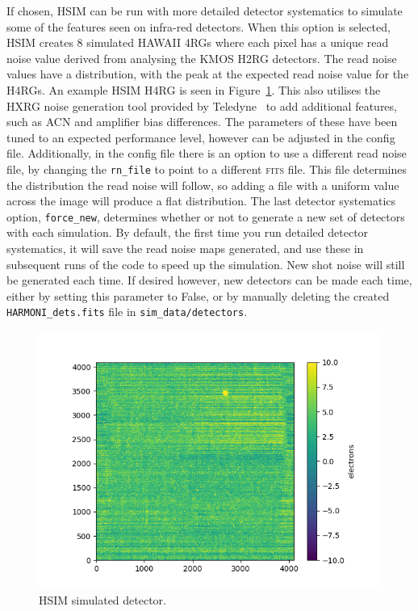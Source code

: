 \documentclass[12pt]{report}
\begin{document}
If chosen, HSIM can be run with more detailed detector systematics to simulate some of the features seen on infra-red detectors. When this option is selected, HSIM creates 8 simulated HAWAII 4RGs where each pixel has a unique read noise value derived from analysing the KMOS H2RG detectors. The read noise values have a distribution, with the peak at the expected read noise value for the H4RGs. An example HSIM H4RG is seen in Figure~\ref{fig:hsimdet}. This also utilises the HXRG noise generation tool provided by Teledyne~\citep{Rauscher2015} to add additional features, such as ACN and amplifier bias differences. The parameters of these have been tuned to an expected performance level, however can be adjusted in the config file.  Additionally, in the config file there is an option to use a different read noise file, by changing the \texttt{rn\_file} to point to a different \textsc{fits} file. This file determines the distribution the read noise will follow, so adding a file with a uniform value across the image will produce a flat distribution. The last detector systematics option, \texttt{force\_new}, determines whether or not to generate a new set of detectors with each simulation. By default, the first time you run detailed detector systematics, it will save the read noise maps generated, and use these in subsequent runs of the code to speed up the simulation. New shot noise will still be generated each time. If desired however, new detectors can be made each time, either by setting this parameter to False, or by manually deleting the created \texttt{HARMONI\_dets.fits} file in \texttt{sim\_data/detectors}.

\begin{figure}[!h]
\centering
\includegraphics[width=\textwidth]{hsim-sim-det.png}
\caption{\small HSIM simulated detector.}\label{fig:hsimdet}
\end{figure}
\end{document}
